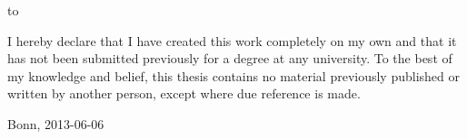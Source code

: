 \thispagestyle{empty}

\vspace*{30\baselineskip}

\hbox to \textwidth{\hrulefill}
\par
I hereby declare that I have created this work completely on my own and that it has not been submitted previously for a degree at any university. To the best of my knowledge and belief, this thesis contains no material previously published or written by another person, except where due reference is made.

\vspace{1cm}
Bonn, 2013-06-06

